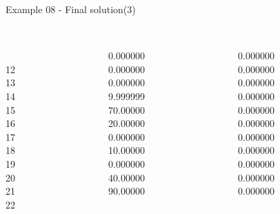 \begin{frame}{Example 08 - Final solution(3)}
\footnotesize

\begin{columns}[t]
\begin{column}{0.3\textwidth}
\\
\\

12\\
13\\
14\\
15\\
16\\
17\\
18\\
19\\
20\\
21\\
22\\

\end{column}
\begin{column}{0.3\textwidth}

\\
0.000000\\
0.000000\\
0.000000\\
9.999999\\
70.00000\\
20.00000\\
0.000000\\
10.00000\\
0.000000\\
40.00000\\
90.00000\\

\end{column}  

\begin{column}{0.3\textwidth}
\\
0.000000\\
0.000000\\
0.000000\\
0.000000\\
0.000000\\
0.000000\\
0.000000\\
0.000000\\
0.000000\\
0.000000\\
0.000000\\

                           
\end{column}
\end{columns}  

\end{frame}
